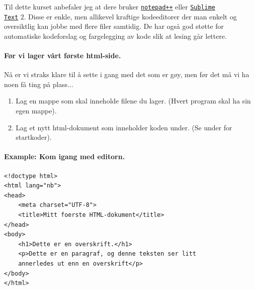 \documentclass[%
oneside,                 %
final,                   %
12pt]{article}
\newenvironment{notice_mdfboxadmon}[1][]{
\begin{notice_mdfboxmdframed}[frametitle=#1]
}
{
\end{notice_mdfboxmdframed}
}
\begin{document}
Til dette kurset anbefaler jeg at dere bruker
\href{{https://notepad-plus-plus.org}}{\nolinkurl{notepad++}} eller \href{{http://www.sublimetext.com/2}}{\nolinkurl{Sublime
Text}} 2. Disse er enkle, men allikevel
kraftige kodeeditorer der man enkelt og oversiktlig kan jobbe med
flere filer samtidig. De har også god støtte for automatiske
kodeforslag og fargelegging av kode slik at lesing går lettere.

\paragraph{Før vi lager vårt første html-side.}

Nå er vi straks klare til å sette i gang med det som er gøy, men
før det må vi ha noen få ting på plass...


\begin{notice_mdfboxadmon}
\begin{enumerate}
\item Lag en mappe som skal inneholde filene du lager. (Hvert program skal ha sin egen mappe).

\item Lag et nytt html-dokument som inneholder koden under. (Se under for startkoder).
\end{enumerate}

\noindent
\end{notice_mdfboxadmon}



\paragraph{Example: Kom igang med editorn.}
\label{example:komigang}


\begin{notice_mdfboxadmon}
\begin{verbatim}
<!doctype html>
<html lang="nb">
<head>
	<meta charset="UTF-8">
	<title>Mitt foerste HTML-dokument</title>
</head>
<body>
	<h1>Dette er en overskrift.</h1> 
	<p>Dette er en paragraf, og denne teksten ser litt 
    annerledes ut enn en overskrift</p>
</body>
</html>
\end{verbatim}
\end{notice_mdfboxadmon}

 
\end{document}
